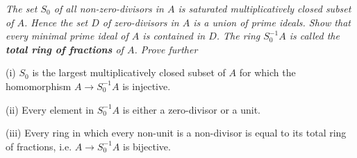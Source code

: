 \begin{problem}\em
The set $S_0$ of all non-zero-divisors in $A$ is saturated multiplicatively closed subset of $A$. Hence the set $D$ of zero-divisors in $A$ is a union of prime ideals. Show that every minimal prime ideal of $A$ is contained in $D$. The ring $S_0^{-1}A$ is called the \textbf{total ring of fractions} of $A$. Prove further\par
(i) $S_0$ is the largest multiplicatively closed subset of $A$ for which the homomorphism $A\to S_0^{-1}A$ is injective.\par
(ii) Every element in $S_0^{-1}A$ is either a zero-divisor or a unit.\par
(iii) Every ring in which every non-unit is a non-divisor is equal to its total ring of fractions, i.e. $A\to S_0^{-1}A$ is bijective.
\end{problem}